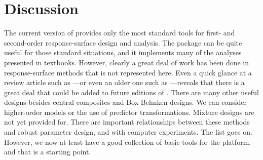 \documentclass[article,nojss]{jss}
\def\rsm{\pkg{rsm}}
\def\R{\proglang{R}}
\begin{document}
\section{Discussion}
The current version of \rsm{} provides only the most standard tools for first- and second-order response-surface design and analysis.  The package can be quite useful for those standard situations, and it implements many of the analyses presented in textbooks.  However, clearly a great deal of work has been done in response-surface methods that is not represented here.
Even a quick glance at a review article such as \cite{Mye04}---or even an older one such as \cite{Hil89}---reveals that there is a great deal that could be added to future editions of \rsm{}.  There are many other useful designs besides central composites and Box-Behnken designs.  We can consider higher-order models or the use of predictor transformations.  Mixture designs are not yet provided for.  There are important relationships between these methods and robust parameter design, and with computer experiments.  The list goes on.  However, we now at least have a good collection of basic tools for the \R{} platform, and that is a starting point.





\end{document}
